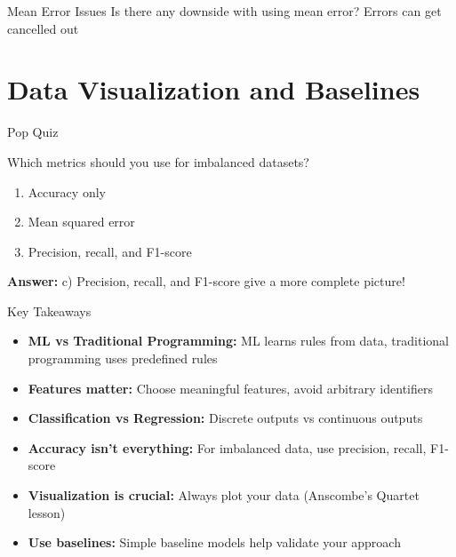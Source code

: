 \documentclass[usenames,dvipsnames]{beamer}
\begin{document}
\begin{frame}{Mean Error Issues}
Is there any downside with using mean error?
\pause Errors can get cancelled out

\end{frame}

\section{Data Visualization and Baselines}

\begin{frame}{Pop Quiz}
\begin{popquizbox}{1}
Which metrics should you use for imbalanced datasets?
\begin{enumerate}
\item Accuracy only  
\item Mean squared error
\item Precision, recall, and F1-score
\end{enumerate}

\vspace{0.5em}
\textbf{Answer:} c) Precision, recall, and F1-score give a more complete picture!
\end{popquizbox}
\end{frame}

\begin{frame}{Key Takeaways}
\begin{itemize}
\item \textbf{ML vs Traditional Programming:} ML learns rules from data, traditional programming uses predefined rules
	\pause
\item \textbf{Features matter:} Choose meaningful features, avoid arbitrary identifiers
	\pause
\item \textbf{Classification vs Regression:} Discrete outputs vs continuous outputs
	\pause
\item \textbf{Accuracy isn't everything:} For imbalanced data, use precision, recall, F1-score
	\pause
\item \textbf{Visualization is crucial:} Always plot your data (Anscombe's Quartet lesson)
	\pause
\item \textbf{Use baselines:} Simple baseline models help validate your approach
\end{itemize}
\end{frame}
\end{document}
